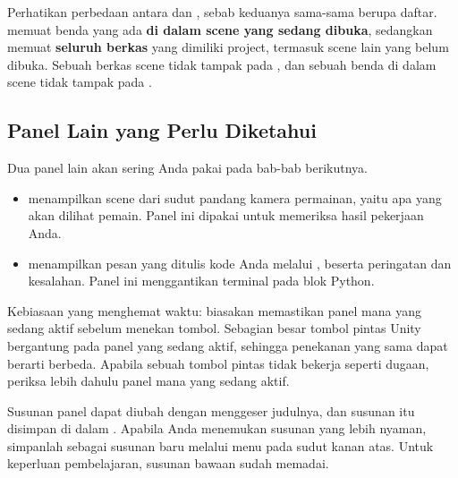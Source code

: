Perhatikan perbedaan antara  dan ,
sebab keduanya sama-sama berupa daftar.  memuat benda yang
ada \textbf{di dalam scene yang sedang dibuka}, sedangkan
 memuat \textbf{seluruh berkas} yang dimiliki project,
termasuk scene lain yang belum dibuka. Sebuah berkas scene tidak tampak pada
, dan sebuah benda di dalam scene tidak tampak pada
.

\subsection{Panel Lain yang Perlu Diketahui}

Dua panel lain akan sering Anda pakai pada bab-bab berikutnya.

\begin{itemize}
  \item {} menampilkan scene dari sudut pandang kamera permainan,
        yaitu apa yang akan dilihat pemain. Panel ini dipakai untuk memeriksa
        hasil pekerjaan Anda.
  \item {} menampilkan pesan yang ditulis kode Anda melalui
        , beserta peringatan dan kesalahan. Panel ini
        menggantikan terminal pada blok Python.
\end{itemize}

\begin{tipsbox}
Kebiasaan yang menghemat waktu: biasakan memastikan panel mana yang sedang
aktif sebelum menekan tombol. Sebagian besar tombol pintas Unity bergantung
pada panel yang sedang aktif, sehingga penekanan yang sama dapat berarti
berbeda. Apabila sebuah tombol pintas tidak bekerja seperti dugaan, periksa
lebih dahulu panel mana yang sedang aktif.
\end{tipsbox}

\begin{catatabox}
Susunan panel dapat diubah dengan menggeser judulnya, dan susunan itu disimpan
di dalam . Apabila Anda menemukan susunan yang lebih nyaman,
simpanlah sebagai susunan baru melalui menu  pada sudut kanan
atas. Untuk keperluan pembelajaran, susunan bawaan sudah memadai.
\end{catatabox}
